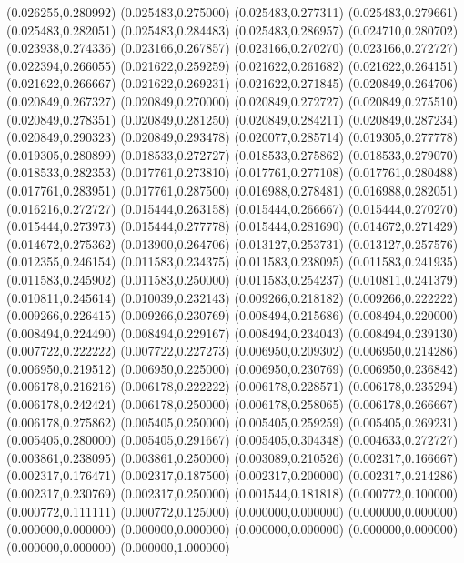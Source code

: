 (0.026255,0.280992)
(0.025483,0.275000)
(0.025483,0.277311)
(0.025483,0.279661)
(0.025483,0.282051)
(0.025483,0.284483)
(0.025483,0.286957)
(0.024710,0.280702)
(0.023938,0.274336)
(0.023166,0.267857)
(0.023166,0.270270)
(0.023166,0.272727)
(0.022394,0.266055)
(0.021622,0.259259)
(0.021622,0.261682)
(0.021622,0.264151)
(0.021622,0.266667)
(0.021622,0.269231)
(0.021622,0.271845)
(0.020849,0.264706)
(0.020849,0.267327)
(0.020849,0.270000)
(0.020849,0.272727)
(0.020849,0.275510)
(0.020849,0.278351)
(0.020849,0.281250)
(0.020849,0.284211)
(0.020849,0.287234)
(0.020849,0.290323)
(0.020849,0.293478)
(0.020077,0.285714)
(0.019305,0.277778)
(0.019305,0.280899)
(0.018533,0.272727)
(0.018533,0.275862)
(0.018533,0.279070)
(0.018533,0.282353)
(0.017761,0.273810)
(0.017761,0.277108)
(0.017761,0.280488)
(0.017761,0.283951)
(0.017761,0.287500)
(0.016988,0.278481)
(0.016988,0.282051)
(0.016216,0.272727)
(0.015444,0.263158)
(0.015444,0.266667)
(0.015444,0.270270)
(0.015444,0.273973)
(0.015444,0.277778)
(0.015444,0.281690)
(0.014672,0.271429)
(0.014672,0.275362)
(0.013900,0.264706)
(0.013127,0.253731)
(0.013127,0.257576)
(0.012355,0.246154)
(0.011583,0.234375)
(0.011583,0.238095)
(0.011583,0.241935)
(0.011583,0.245902)
(0.011583,0.250000)
(0.011583,0.254237)
(0.010811,0.241379)
(0.010811,0.245614)
(0.010039,0.232143)
(0.009266,0.218182)
(0.009266,0.222222)
(0.009266,0.226415)
(0.009266,0.230769)
(0.008494,0.215686)
(0.008494,0.220000)
(0.008494,0.224490)
(0.008494,0.229167)
(0.008494,0.234043)
(0.008494,0.239130)
(0.007722,0.222222)
(0.007722,0.227273)
(0.006950,0.209302)
(0.006950,0.214286)
(0.006950,0.219512)
(0.006950,0.225000)
(0.006950,0.230769)
(0.006950,0.236842)
(0.006178,0.216216)
(0.006178,0.222222)
(0.006178,0.228571)
(0.006178,0.235294)
(0.006178,0.242424)
(0.006178,0.250000)
(0.006178,0.258065)
(0.006178,0.266667)
(0.006178,0.275862)
(0.005405,0.250000)
(0.005405,0.259259)
(0.005405,0.269231)
(0.005405,0.280000)
(0.005405,0.291667)
(0.005405,0.304348)
(0.004633,0.272727)
(0.003861,0.238095)
(0.003861,0.250000)
(0.003089,0.210526)
(0.002317,0.166667)
(0.002317,0.176471)
(0.002317,0.187500)
(0.002317,0.200000)
(0.002317,0.214286)
(0.002317,0.230769)
(0.002317,0.250000)
(0.001544,0.181818)
(0.000772,0.100000)
(0.000772,0.111111)
(0.000772,0.125000)
(0.000000,0.000000)
(0.000000,0.000000)
(0.000000,0.000000)
(0.000000,0.000000)
(0.000000,0.000000)
(0.000000,0.000000)
(0.000000,0.000000)
(0.000000,1.000000)